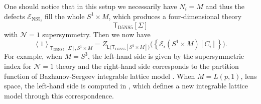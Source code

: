 One should notice that in this setup we necessarily have $N_{i}=M$
and thus the defects $\mathcal{E}_{\mathrm{NS}5_{i}}$ fill the whole
$S^{1}\times M$, which produces a four-dimensional theory
\begin{equation*}
  \mathsf{T}_{\mathrm{D5NS5}}[\Sigma]
\end{equation*}
with $\mathcal{N}=1$ supersymmetry. Then we now have
\begin{equation}
  \left\langle  1  \right\rangle_{\mathsf{T}_{\mathrm{D5NS5}}[\Sigma], S^{1}\times M}
    =Z_{\mathsf{L}\big(\mathsf{T}_{\mathrm{D5NS5}}[S^{1}\times M]\big)}
      \big( \left\{ \mathcal{E}_{i}(S^{1}\times M) [C_i]\right\} \big).
  \label{eq:correspondence1}
\end{equation}
For example, when $M=S^{3}$, the left-hand side is given by the supersymmetric
index for $\mathcal{N}=1$ theory and the right-hand side corresponds
to the partition function of Bazhanov-Sergeev integrable lattice model
\cite{Bazhanov:2010kz,Bazhanov:2011mz,Spiridonov:2010em,Yamazaki:2012cp}. When $M=L(p,1)$,
lens space, the left-hand side is computed in \cite{Yamazaki:2013nra}, which
defines a new integrable lattice model through this correspondence.

